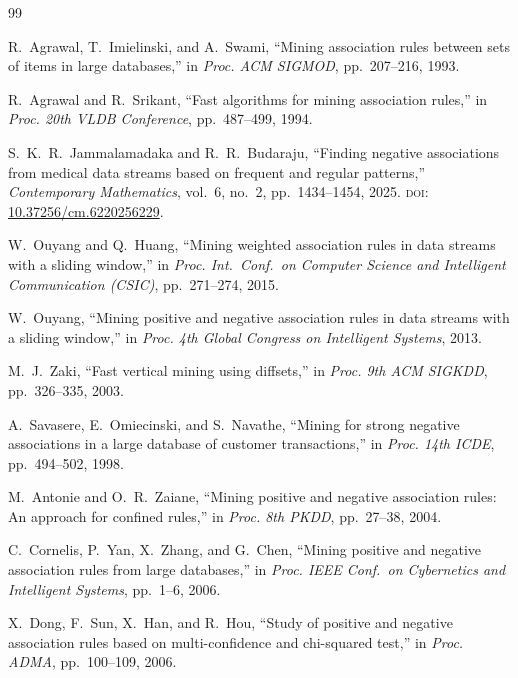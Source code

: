 \documentclass[10pt,twocolumn]{article}
\theoremstyle{plain}
\theoremstyle{definition}
\theoremstyle{remark}
\begin{document}

\begin{thebibliography}{99}

R.~Agrawal, T.~Imielinski, and A.~Swami,
``Mining association rules between sets of items in large databases,''
in \textit{Proc. ACM SIGMOD}, pp.~207--216, 1993.

R.~Agrawal and R.~Srikant,
``Fast algorithms for mining association rules,''
in \textit{Proc. 20th VLDB Conference}, pp.~487--499, 1994.

S.~K.~R.~Jammalamadaka and R.~R.~Budaraju,
``Finding negative associations from medical data streams based on
frequent and regular patterns,''
\textit{Contemporary Mathematics}, vol.~6, no.~2, pp.~1434--1454, 2025.
\textsc{doi}: \href{https://doi.org/10.37256/cm.6220256229}%
{10.37256/cm.6220256229}.

W.~Ouyang and Q.~Huang,
``Mining weighted association rules in data streams with a sliding
window,''
in \textit{Proc. Int.\ Conf.\ on Computer Science and Intelligent
Communication (CSIC)}, pp.~271--274, 2015.

W.~Ouyang,
``Mining positive and negative association rules in data streams with
a sliding window,''
in \textit{Proc. 4th Global Congress on Intelligent Systems}, 2013.

M.~J.~Zaki,
``Fast vertical mining using diffsets,''
in \textit{Proc. 9th ACM SIGKDD}, pp.~326--335, 2003.

A.~Savasere, E.~Omiecinski, and S.~Navathe,
``Mining for strong negative associations in a large database of
customer transactions,''
in \textit{Proc. 14th ICDE}, pp.~494--502, 1998.

M.~Antonie and O.~R.~Zaiane,
``Mining positive and negative association rules: An approach for
confined rules,''
in \textit{Proc. 8th PKDD}, pp.~27--38, 2004.

C.~Cornelis, P.~Yan, X.~Zhang, and G.~Chen,
``Mining positive and negative association rules from large databases,''
in \textit{Proc. IEEE Conf.\ on Cybernetics and Intelligent Systems},
pp.~1--6, 2006.

X.~Dong, F.~Sun, X.~Han, and R.~Hou,
``Study of positive and negative association rules based on
multi-confidence and chi-squared test,''
in \textit{Proc. ADMA}, pp.~100--109, 2006.


\end{thebibliography}
\end{document}
